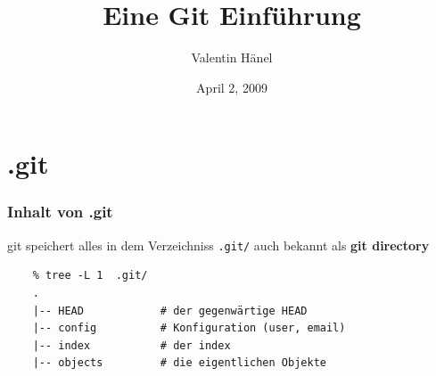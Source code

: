 \documentclass{beamer}
\author{Valentin H\"anel}
\institute{Bernstein Center for Computational Neuroscience Berlin}
\title{Eine Git Einführung}
\date{April 2, 2009}
\begin{document}

\begin{frame}
	\titlepage
\end{frame}




\section{.git}

\begin{frame}[fragile]
\frametitle{Inhalt von .git}

git speichert alles in dem Verzeichniss {\tt.git/} auch bekannt als \textbf{git
directory}

\begin{verbatim}
    % tree -L 1  .git/
    .
    |-- HEAD            # der gegenwärtige HEAD
    |-- config          # Konfiguration (user, email)
    |-- index           # der index
    |-- objects         # die eigentlichen Objekte

\end{verbatim}

\end{frame}



\end{document}
